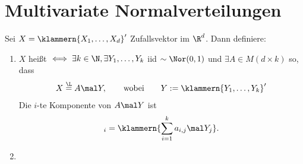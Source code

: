 
\section{Multivariate Normalverteilungen}

\begin{definition}\label{def5.1}
	Sei $X=\klammern{X_1,\ldots,X_d}'$ Zufallsvektor im $\R^d$.
	Dann definiere:
	\begin{enumerate}[label=(\arabic*)]
		\item $X$ heißt 
		$\iff\exists k\in\N,\exists Y_1,\ldots,Y_k$ iid $\sim\Nor(0,1)$ und $\exists A\in M(d\times k)$ so, dass
		\begin{align*}
			X\overset{\L}{=}A\mal Y,
			\qquad\text{wobei}\qquad
			Y:=\klammern{Y_1,\ldots,Y_k}'
		\end{align*}
		Die $i$-te Komponente von $A\mal Y$ ist
		\begin{align*}
			[A\mal Y]_i=\klammern{\sum\limits_{i=1}^k a_{i,j}\mal Y_j}.
		\end{align*}				
		\label{item:def5.1_1}
		\item 
	\end{enumerate}
\end{definition}
